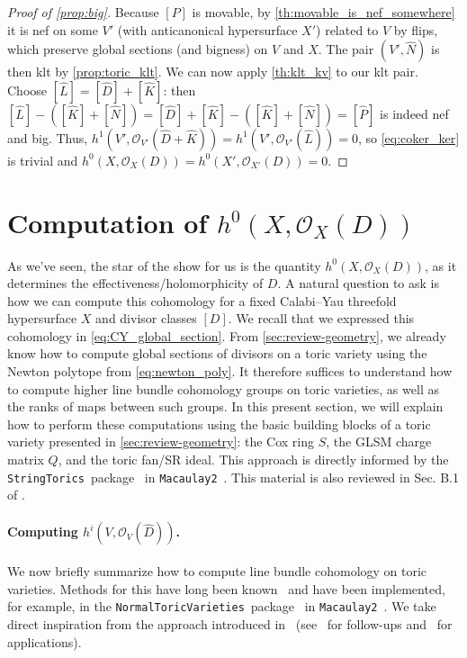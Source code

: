 \documentclass[11pt,dvipsnames]{article}
\theoremstyle{definition}
\begin{document}
\begin{proof}[Proof of \cref{prop:big}]
    Because $[P]$ is movable, by \cref{th:movable_is_nef_somewhere} it is nef on some $V'$ (with anticanonical hypersurface $X'$) related to $V$ by flips, which preserve global sections (and bigness) on $V$ and $X$. The pair $(V', \hat{N})$ is then klt by \cref{prop:toric_klt}. We can now apply \cref{th:klt_kv} to our klt pair. Choose $[\hat{L}] = [\hat{D}] + [\hat{K}]$: then $[\hat{L}] - ([\hat{K}] + [\hat{N}]) = [\hat{D}] + [\hat{K}] - ([\hat{K}] + [\hat{N}]) = [\hat{P}]$ is indeed nef and big. Thus, $h^1(V', \mathcal{O}_{V'}(\hat{D} + \hat{K})) = h^1(V', \mathcal{O}_{V'}(\hat{L})) = 0$, so \cref{eq:coker_ker} is trivial and $h^0(X,\mathcal{O}_{X}(D)) = h^0(X',\mathcal{O}_{X'}(D)) = 0$.
\end{proof}

\section{Computation of $h^{0}(X,\mathcal{O}_X(D))$} \label{sec:direct_comp}

As we've seen, the star of the show for us is the quantity $h^0(X,\mathcal{O}_X(D))$, as it determines the effectiveness/holomorphicity of $D$. A natural question to ask is how we can compute this cohomology for a fixed Calabi--Yau threefold hypersurface $X$ and divisor classes $[D]$. We recall that we expressed this cohomology in \cref{eq:CY_global_section}. From \cref{sec:review-geometry}, we already know how to compute global sections of divisors on a toric variety using the Newton polytope from \cref{eq:newton_poly}. It therefore suffices to understand how to compute higher line bundle cohomology groups on toric varieties, as well as the ranks of maps between such groups. In this present section, we will explain how to perform these computations using the basic building blocks of a toric variety presented in \cref{sec:review-geometry}: the Cox ring $S$, the GLSM charge matrix $Q$, and the toric fan/SR ideal. This approach is directly informed by the \verb+StringTorics+~package~\cite{StringToricsSource} in \verb+Macaulay2+~\cite{M2}. This material is also reviewed in Sec. B.1 of \cite{Demirtas:2019lfi}.

\paragraph{Computing $h^i(V,\mathcal{O}_V(\hat{D}))$.} We now briefly summarize how to compute line bundle cohomology on toric varieties. Methods for this have long been known~\cite{mustata_local_2000, eisenbud_coho, maclagan_multigraded_2004} and have been implemented, for example, in the \verb+NormalToricVarieties+~package~\cite{NormalToricVarietiesSource} in \verb+Macaulay2+~\cite{M2}. We take direct inspiration from the approach introduced in~\cite{Blumenhagen:2010pv, Demirtas:2019lfi} (see~\cite{jow_cohomology_2011, Rahn:2010fm, cohomCalg:Implementation} for follow-ups and~\cite{Blumenhagen:2010ed} for applications).
\end{document}
